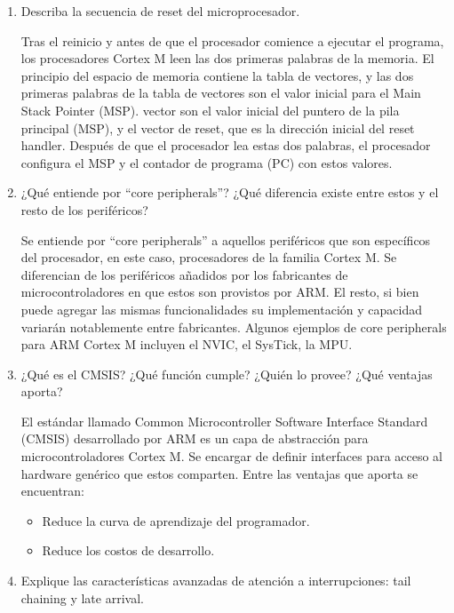 \documentclass[12pt, a4paper]{article}
\makeatletter
\newcommand\setItemnumber[1]{\setcounter{enum\romannumeral\@enumdepth}{\numexpr#1-1\relax}}
\makeatother
\begin{document}
\begin{enumerate}
    \setItemnumber{11} 
    \item Describa la secuencia de reset del microprocesador.
    
    Tras el reinicio y antes de que el procesador comience a ejecutar el programa, los procesadores 
    Cortex M leen las dos primeras palabras de la memoria. El principio del espacio de memoria contiene
    la tabla de vectores, y las dos primeras palabras de la tabla de vectores son el valor inicial para el 
    Main Stack Pointer (MSP). vector son el valor inicial del puntero de la pila principal (MSP), 
    y el vector de reset, que es la dirección inicial del reset handler. Después de que el procesador 
    lea estas dos palabras, el procesador configura el MSP y el contador de programa (PC) con estos 
    valores.
    
    
    \setItemnumber{12}
    \item ¿Qué entiende por ``core peripherals''? ¿Qué diferencia existe entre estos y 
    el resto de los periféricos?
    
    Se entiende por ``core peripherals'' a aquellos periféricos que son específicos del 
    procesador, en este caso, procesadores de la familia Cortex M. Se diferencian de los 
    periféricos añadidos por los fabricantes de microcontroladores en que estos son provistos 
    por ARM. El resto, si bien puede agregar las mismas funcionalidades su implementación y capacidad
    variarán notablemente entre fabricantes. Algunos ejemplos de core peripherals para ARM Cortex M 
    incluyen el NVIC, el SysTick, la MPU.
    
    \setItemnumber{14}
    \item ¿Qué es el CMSIS? ¿Qué función cumple? ¿Quién lo provee? ¿Qué ventajas aporta?
    
    El estándar llamado Common Microcontroller Software Interface Standard (CMSIS) desarrollado por 
    ARM es un capa de abstracción para microcontroladores Cortex M. Se encargar de definir interfaces
    para acceso al hardware genérico que estos comparten. Entre las ventajas que aporta se encuentran:
    
    \begin{itemize}
        \item Reduce la curva de aprendizaje del programador.
        \item Reduce los costos de desarrollo.
    \end{itemize}
    
    \setItemnumber{16}
    \item Explique las características avanzadas de atención a interrupciones: tail chaining y late
    arrival.
    

\end{enumerate}
\end{document}
